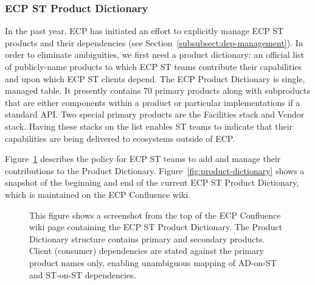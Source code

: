 \subsubsection{ECP ST Product Dictionary}
In the past year, ECP has initiated an effort to explicitly manage ECP ST products and their dependencies (see Section~\ref{subsubsect:dep-management}).  In order to eliminate ambiguities, we first need a product dictionary: an official list of publicly-name products to which ECP ST teams contribute their capabilities and upon which ECP ST clients depend.  The ECP Product Dictionary is single, managed table.  It presently contains 70 primary products along with subproducts that are either components within a product or particular implementations if a standard API.  Two special primary products are the Facilities stack and Vendor stack.  Having these stacks on the list enables ST teams to indicate that their capabilities are being delivered to ecosystems outside of ECP.

Figure~\ref{fig:product-dictionary-overview} describes the policy for ECP ST teams to add and manage their contributions to the Product Dictionary.  Figure~\ref{fig:product-dictionary} shows a snapshot of the beginning and end of the current ECP ST Product Dictionary, which is maintained on the ECP Confluence wiki.

\begin{figure}
	\centering
	\caption{This figure shows a screenshot from the top of the ECP Confluence wiki page containing the ECP ST Product Dictionary.  The Product Dictionary structure contains primary and secondary products.  Client (consumer) dependencies are stated against the primary product names only, enabling unambiguous mapping of AD-on-ST and ST-on-ST dependencies.}
	\label{fig:product-dictionary-overview}
\end{figure}

